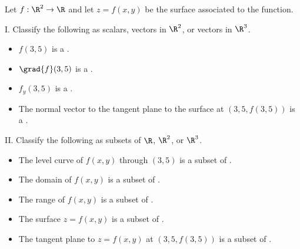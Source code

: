 \documentclass{ximera}
\author{Jim Talamo}
\begin{document}
\begin{exercise}
Let $f:\R^2 \to \R$ and let $z=f(x,y)$ be the surface associated to the function.

I. Classify the following as scalars, vectors in $\R^2$, or vectors in $\R^3$.

\begin{itemize}
\item $f(3,5)$ is a .
\item $\grad{f}(3,5)$ is a . 
\item $f_y(3,5)$ is a .
\item The normal vector to the tangent plane to the surface at $(3,5,f(3,5))$ is a .
\end{itemize}

II. Classify the following as subsets of $\R$, $\R^2$, or $\R^3$.

\begin{itemize} 
\item The level curve of $f(x,y)$ through $(3,5)$ is a subset of .
\item The domain of $f(x,y)$ is a subset of .
\item The range of $f(x,y)$  is a subset of .
\item The surface $z=f(x,y)$  is a subset of . 
\item The tangent plane to $z=f(x,y)$ at $(3,5,f(3,5))$  is a subset of .
\end{itemize}

\end{exercise}
\end{document}
